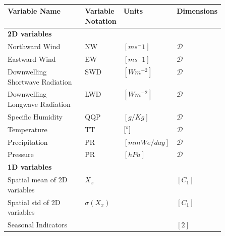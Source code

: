 \begin{table}[tbp]
    \centering
    \caption{}
    \renewcommand\arraystretch{1.5}
    \begin{tabular}{l>{\centering}p{0.1\linewidth}>{\centering}p{0.2\linewidth}>{\centering\arraybackslash}p{0.2\linewidth}}
    \toprule
        \textbf{Variable Name} & \textbf{Variable Notation} & \textbf{Units} & \textbf{Dimensions} \\ \toprule
        \textbf{2D variables} & & & \\ \bottomrule 
        Northward Wind & NW & $[ms^-1]$ & $ \mathcal{D}$   \\ 
        Eastward Wind & EW & $[ms^-1]$ & $ \mathcal{D}$ \\
        Downwelling Shortwave Radiation & SWD & $[Wm^{-2}]$ & $ \mathcal{D}$ \\
        Downwelling Longwave Radiation & LWD & $[Wm^{-2}]$ & $ \mathcal{D}$ \\
        Specific Humidity & QQP & $[g/Kg]$ & $ \mathcal{D}$ \\
        Temperature & TT & $[\degree]$ & $ \mathcal{D}$ \\
        Precipitation & PR & $[mmWe/day]$ & $ \mathcal{D}$  \\
        Pressure & PR & $[hPa]$ & $ \mathcal{D}$  \\
        \toprule
         \textbf{1D variables} & & & \\ \bottomrule
        Spatial mean of 2D variables & $\bar{X}_{x}$ & & $[C_1]$ \\ 
        Spatial std of 2D variables & $\sigma\left(X_{x}\right)$ & & $[C_1]$ \\
        Seasonal Indicators & & & $[2]$\\ \bottomrule
        
    \end{tabular}
            \label{tab:features}
\end{table}